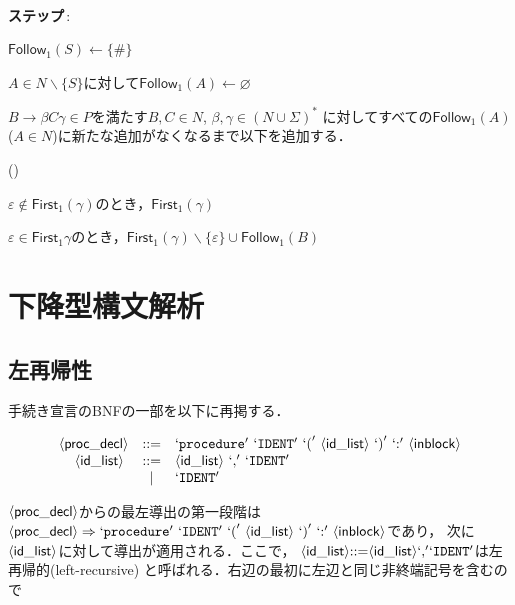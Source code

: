 \documentclass[dvipdfmx,a4j]{jbook}
\newcounter{coffee}
\newcounter{bean}
\begin{document}
\begin{Alg}\ 
  \begin{list}{{\bf ステップ}\,{\rm {}:}}{}
    \item $\mathsf{Follow}_1(S)\leftarrow\{\#\}$
    \item $A\in N\backslash\{S\}$に対して$\mathsf{Follow}_1(A)\leftarrow\varnothing$
    \item 
    $B\rightarrow\beta C\gamma\in P$を満たす$B,C\in N$, $\beta,\gamma\in(N\cup\Sigma)^\ast$
    に対してすべての$\mathsf{Follow}_1(A)$($A\in N$)に新たな追加がなくなるまで以下を追加する．
    \begin{list}{(\alph{bean})}{\usecounter{bean}}
      \item $\varepsilon\notin\mathsf{First}_1(\gamma)$のとき，$\mathsf{First}_1(\gamma)$
      \item $\varepsilon\in\mathsf{First}_1{\gamma}$のとき，$\mathsf{First}_1(\gamma)\backslash\{\varepsilon\}\cup\mathsf{Follow}_1(B)$
    \end{list}
  \end{list}
\end{Alg}

\section{下降型構文解析}

\subsection{左再帰性}

手続き宣言のBNFの一部を以下に再掲する．

\[\begin{array}{rcl}
\NTerm{proc\_decl} & \mathtt{::=} & \Term{procedure}\ \Term{IDENT}\ \Term{(}\ 
\NTerm{id\_list}\ \Term{)}\ \Term{:}\ \NTerm{inblock}\\
\NTerm{id\_list}\ & \mathtt{::=} & \NTerm{id\_list}\ \Term{,}\ \Term{IDENT}\\
& | & \Term{IDENT}\\
\end{array}\]

$\langle{\mbox{$\mathsf{proc\_decl}$}}\rangle$からの最左導出の第一段階は
$\NTerm{proc\_decl}\Rightarrow\Term{procedure}\ \Term{IDENT}\ \Term{(}\ \NTerm{id\_list}\ \Term{)}\ \Term{:}\ \NTerm{inblock}$であり，
次に$\langle{\mbox{$\mathsf{id\_list}$}}\rangle$に対して導出が適用される．ここで，
$\langle{\mbox{$\mathsf{id\_list}$}}\rangle\mathtt{::=}\langle{\mbox{$\mathsf{id\_list}$}}\rangle`\mbox{$\mathtt{,}$}'`\mbox{$\mathtt{IDENT}$}'$は左再帰的(left-recursive)
と呼ばれる．右辺の最初に左辺と同じ非終端記号を含むので
\end{document}
